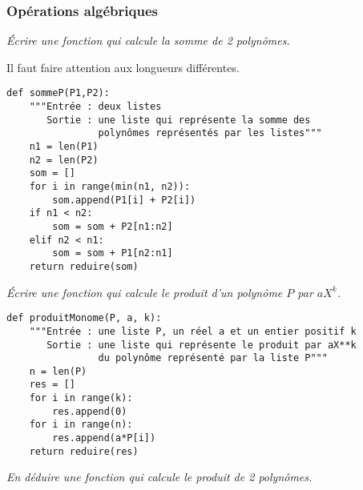 \subsubsection{Opérations algébriques}
\begin{Exercise}\it Écrire une fonction qui calcule la somme de 2 polynômes.
\end{Exercise}
\begin{Answer}Il faut faire attention aux longueurs différentes.
\begin{lstlisting}
def sommeP(P1,P2):
    """Entrée : deux listes
       Sortie : une liste qui représente la somme des
                polynômes représentés par les listes"""
    n1 = len(P1)
    n2 = len(P2)
    som = []
    for i in range(min(n1, n2)):
        som.append(P1[i] + P2[i])
    if n1 < n2:
        som = som + P2[n1:n2]
    elif n2 < n1:
        som = som + P1[n2:n1]
    return reduire(som)
\end{lstlisting}
\end{Answer}
\begin{Exercise}\it Écrire une fonction  qui calcule le produit d'un polynôme $P$ par $aX^k$.
\end{Exercise}
\begin{Answer}
\begin{lstlisting}
def produitMonome(P, a, k):
    """Entrée : une liste P, un réel a et un entier positif k
       Sortie : une liste qui représente le produit par aX**k
                du polynôme représenté par la liste P"""
    n = len(P)
    res = []
    for i in range(k):
        res.append(0)
    for i in range(n):
        res.append(a*P[i])
    return reduire(res)
\end{lstlisting}
\end{Answer}
\begin{Exercise}\it En déduire une fonction  qui calcule le produit de 2 polynômes.

\end{Exercise}
